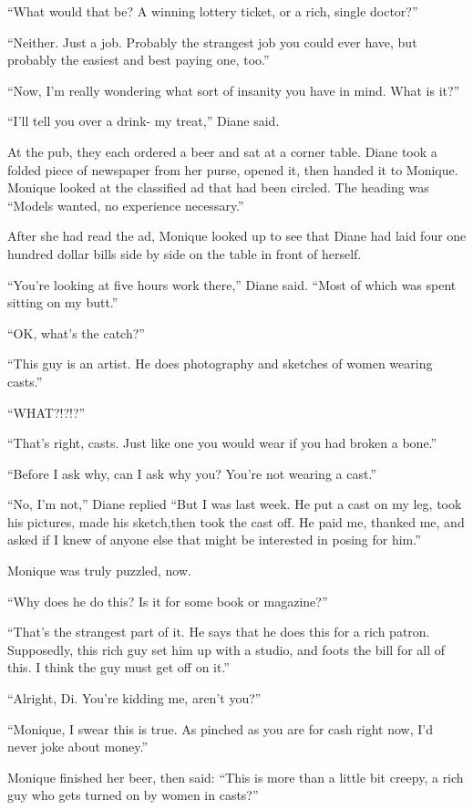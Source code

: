``What would that be? A winning lottery ticket, or a rich, single doctor?''

``Neither. Just a job. Probably the strangest job you could ever have, but probably the easiest
and best paying one, too.''

``Now, I'm really wondering what sort of insanity you have in mind. What is it?''

``I'll tell you over a drink- my treat,'' Diane said.

At the pub, they each ordered a beer and sat at a corner table. Diane took a folded piece of
newspaper from her purse, opened it, then handed it to Monique. Monique looked at the classified
ad that had been circled. The heading was ``Models wanted, no experience necessary.''

After she had read the ad, Monique looked up to see that Diane had laid four one hundred dollar
bills side by side on the table in front of herself.

``You're looking at five hours work there,'' Diane said. ``Most of which was spent sitting on my
butt.''

``OK, what's the catch?''

``This guy is an artist. He does photography and sketches of women wearing casts.''

``WHAT?!?!?''

``That's right, casts. Just like one you would wear if you had broken a bone.''

``Before I ask why, can I ask why you? You're not wearing a cast.''

``No, I'm not,'' Diane replied ``But I was last week. He put a cast on my leg, took his
pictures, made his sketch,then took the cast off. He paid me, thanked me, and asked if I knew of
anyone else that might be interested in posing for him.''

Monique was truly puzzled, now.

``Why does he do this? Is it for some book or magazine?''

``That's the strangest part of it. He says that he does this for a rich patron. Supposedly, this
rich guy set him up with a studio, and foots the bill for all of this. I think the guy must get
off on it.''

``Alright, Di. You're kidding me, aren't you?''

``Monique, I swear this is true. As pinched as you are for cash right now, I'd never joke about
money.''

Monique finished her beer, then said: ``This is more than a little bit creepy, a rich guy who
gets turned on by women in casts?''


